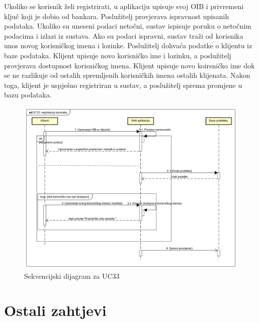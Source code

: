 			
			
			Ukoliko se korisnik želi registrirati, u aplikaciju upisuje svoj OIB i privremeni ključ koji je dobio od bankara. Poslužitelj provjerava ispravnost upisanih podataka. Ukoliko su uneseni podaci netočni, sustav ispisuje poruku o netočnim podacima i izlazi iz sustava. Ako su podaci ispravni, sustav traži od korisnika unos novog korisničkog imena i lozinke. Poslužitelj dohvaća podatke o klijentu iz baze podataka. Klijent upisuje novo korisničko ime i lozinku, a poslužitelj provjerava dostupnost korisničkog imena. Klijent upisuje novo koirsničko ime dok se ne razlikuje od ostalih spremljenih korisničkih imena ostalih klijenata. Nakon toga, klijent je uspješno registriran u sustav, a poslužitelj sprema promjene u bazu podataka.
			\eject
			
			\begin{figure}[H]
				\includegraphics[scale=0.50]{slike/UC33- registracija korisnika.PNG}
				\centering
				\caption{Sekvencijski dijagram za UC33}
				\label{fig:uc33}
			\end{figure}
			\eject
			
	
		\section{Ostali zahtjevi}
			 
